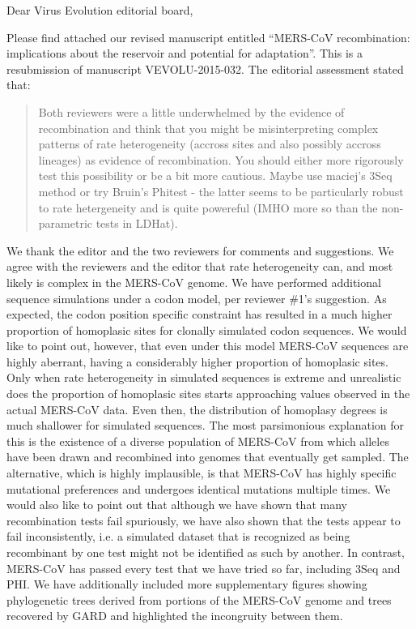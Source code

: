 \documentclass[11pt,oneside,letterpaper]{article}
\begin{document}

Dear Virus Evolution editorial board,

Please find attached our revised manuscript entitled ``MERS-CoV recombination: implications about the reservoir and potential for adaptation''.  This is a resubmission of manuscript VEVOLU-2015-032. The editorial assessment stated that:

\begin{quote}
Both reviewers were a little underwhelmed by the evidence of recombination and think that you might be misinterpreting complex patterns of rate heterogeneity (accross sites and also possibly accross lineages) as evidence of recombination. 
You should either more rigorously test this possibility or be a bit more cautious.  
Maybe use maciej's 3Seq method or try Bruin's Phitest - the latter seems to be particularly robust to rate hetergeneity and is quite powereful (IMHO more so than the non-parametric tests in LDHat).
\end{quote}

We thank the editor and the two reviewers for comments and suggestions. 
We agree with the reviewers and the editor that rate heterogeneity can, and most likely is complex in the MERS-CoV genome. 
We have performed additional sequence simulations under a codon model, per reviewer \#1’s suggestion. 
As expected, the codon position specific constraint has resulted in a much higher proportion of homoplasic sites for clonally simulated codon sequences. 
We would like to point out, however, that even under this model MERS-CoV sequences are highly aberrant, having a considerably higher proportion of homoplasic sites. 
Only when rate heterogeneity in simulated sequences is extreme and unrealistic does the proportion of homoplasic sites starts approaching values observed in the actual MERS-CoV data. 
Even then, the distribution of homoplasy degrees is much shallower for simulated sequences. 
The most parsimonious explanation for this is the existence of a diverse population of MERS-CoV from which alleles have been drawn and recombined into genomes that eventually get sampled. 
The alternative, which is highly implausible, is that MERS-CoV has highly specific mutational preferences and undergoes identical mutations multiple times. 
We would also like to point out that although we have shown that many recombination tests fail spuriously, we have also shown that the tests appear to fail inconsistently, i.e. a simulated dataset that is recognized as being recombinant by one test might not be identified as such by another. 
In contrast, MERS-CoV has passed every test that we have tried so far, including 3Seq and PHI. We have additionally included more supplementary figures showing phylogenetic trees derived from portions of the MERS-CoV genome and trees recovered by GARD and highlighted the incongruity between them. 
\end{document}
